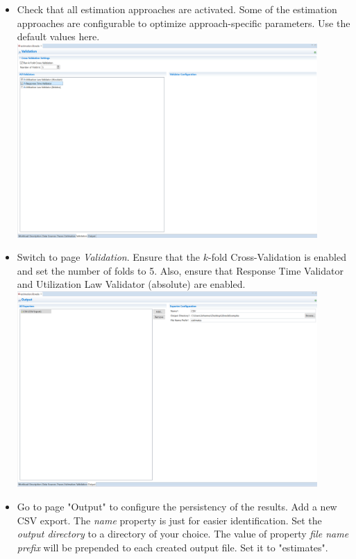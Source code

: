 \begin{itemize}
	\item 	Check that all estimation approaches are activated. Some of the estimation approaches are configurable to optimize approach-specific parameters. Use the default values here. \newline
			\newline
			\includegraphics[width=0.9\textwidth]{screenshots/Screenshot21}	
	\item Switch to page \emph{Validation}. Ensure that the $k$-fold Cross-Validation is enabled and set the number of folds to 5. Also, ensure that Response Time Validator and Utilization Law Validator (absolute) are enabled. \newline
			\newline
			\includegraphics[width=0.9\textwidth]{screenshots/Screenshot23}		
	\item Go to page "Output" to configure the persistency of the results. Add a new CSV export. The \emph{name} property is just for easier identification. Set the \emph{output directory} to a directory of your choice. The value of property \emph{file name prefix} will be prepended to each created output file. Set it to "estimates".
    

\end{itemize}
